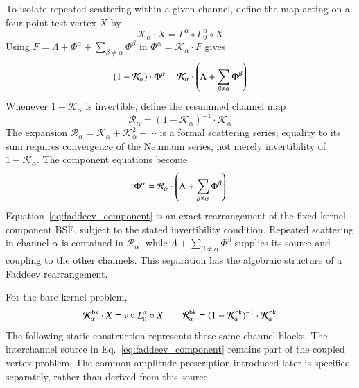 \documentclass[aip,jcp,reprint,noshowkeys,superscriptaddress]{revtex4-1}
\begin{document}
To isolate repeated scattering within a given channel, define the map
acting on a four-point test vertex $X$ by
\begin{equation}
    \mathcal K_{\alpha}\cdot X
    =
    \Gamma^{\alpha}\circ L_0^{\alpha}\circ X
    \label{eq:K_r_def}
\end{equation}
Using $F=\Lambda+\Phi^{\alpha}+\sum_{\beta\ne\alpha}\Phi^{\beta}$ in
$\Phi^{\alpha}=\mathcal K_{\alpha}\cdot F$ gives
\begin{equation}
    (1-\mathcal K_{\alpha})\cdot\Phi^{\alpha}
    =
    \mathcal K_{\alpha}
    \cdot\qty(
        \Lambda+\sum_{\beta\ne\alpha}\Phi^{\beta}
    )
    \label{eq:faddeev_before_resum}
\end{equation}
Whenever $1-\mathcal K_{\alpha}$ is invertible, define the resummed channel map
\begin{equation}
    \mathcal R_{\alpha}
    =
    (1-\mathcal K_{\alpha})^{-1}\cdot\mathcal K_{\alpha}
    \label{eq:channel_resummed_map}
\end{equation}
The expansion $\mathcal R_{\alpha}=\mathcal K_{\alpha}+\mathcal K_{\alpha}^2+\cdots$ is
a formal scattering series; equality to its sum requires convergence of the
Neumann series, not merely invertibility of $1-\mathcal K_{\alpha}$.
The component equations become
\begin{equation}
    \Phi^{\alpha}
    =
    \mathcal R_{\alpha}
    \cdot\qty(
        \Lambda+\sum_{\beta\ne\alpha}\Phi^{\beta}
    )
    \label{eq:faddeev_component}
\end{equation}
Equation~\eqref{eq:faddeev_component} is an exact rearrangement of the
fixed-kernel component BSE, subject to the stated invertibility condition.
Repeated scattering in channel $\alpha$ is contained in $\mathcal R_{\alpha}$, while
$\Lambda+\sum_{\beta\ne\alpha}\Phi^{\beta}$ supplies its source and coupling to the other
channels. This separation has the algebraic structure of a Faddeev
rearrangement.

For the bare-kernel problem,
\begin{equation}
    \mathcal K_{\alpha}^{\rm bk}\cdot X
    =
    v\circ L_0^{\alpha}\circ X
    \qquad
    \mathcal R_{\alpha}^{\rm bk}
    =
    (1-\mathcal K_{\alpha}^{\rm bk})^{-1}\cdot\mathcal K_{\alpha}^{\rm bk}
    \label{eq:bare_channel_resolvent}
\end{equation}
The following static construction represents these same-channel blocks.
The interchannel source in Eq.~\eqref{eq:faddeev_component} remains part of
the coupled vertex problem. The common-amplitude prescription introduced
later is specified separately, rather than derived from this source.
\end{document}
